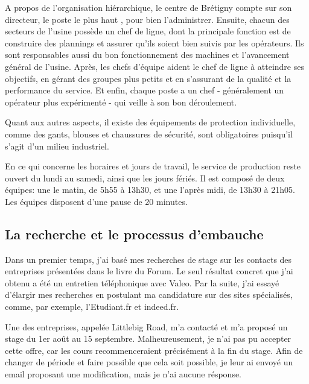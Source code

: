 \documentclass{article}
\begin{document}
\vspace{12pt}

A propos de l'organisation hiérarchique, le centre de Brétigny compte sur son
directeur, le poste le plus haut , pour bien l'administrer. Ensuite, chacun
des secteurs de l'usine possède un chef de ligne, dont la principale fonction
est de construire des plannings et assurer qu'ils soient bien suivis par les
opérateurs. Ils sont responsables aussi du bon fonctionnement des machines
et l'avancement général de l'usine. Après, les chefs d'équipe aident le chef de
ligne à atteindre ses objectifs, en gérant des groupes plus petits et en
s'assurant de la qualité et la performance du service. Et enfin, chaque poste a
un chef - généralement un opérateur plus expérimenté - qui veille à son bon
déroulement.

\vspace{12pt}

Quant aux autres aspects, il existe des équipements de protection individuelle,
comme des gants, blouses et chaussures de sécurité, sont obligatoires puisqu'il
s'agit d'un milieu industriel.

\vspace{12pt}

En ce qui concerne les horaires et jours de travail, le service de production
reste ouvert du lundi au samedi, ainsi que les jours fériés. Il est composé de
deux équipes: une le matin, de 5h55 à 13h30, et une l'après midi, de 13h30 à
21h05. Les équipes disposent d'une pause de 20 minutes.

\subsection{La recherche et le processus d'embauche}

Dans un premier temps, j'ai basé mes recherches de stage sur les contacts des
entreprises présentées dans le livre du Forum. Le seul résultat concret que
j'ai obtenu a été un entretien téléphonique avec Valeo. Par la suite, j'ai
essayé d'élargir mes recherches en postulant ma candidature sur des sites
spécialisés, comme, par exemple, l'Etudiant.fr et indeed.fr.

\vspace{12pt}

Une des entreprises, appelée Littlebig Road, m'a contacté et m'a proposé un
stage du 1er août au 15 septembre.
Malheureusement, je n'ai pas pu accepter cette offre, car les cours
recommenceraient précisément à la fin du stage. Afin de changer de période et
faire possible que cela soit possible, je leur ai envoyé un email proposant
une modification, mais je n'ai aucune résponse.
\end{document}
